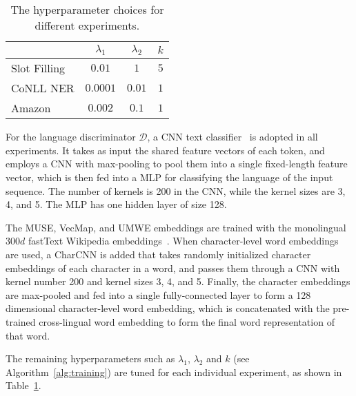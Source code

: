 \documentclass[11pt,a4paper]{article}
\def\gD{{\mathcal{D}}}
\begin{document}
\begin{table}
\centering
\begin{tabular}{l c c c}
        \toprule
        & $\lambda_1$ & $\lambda_2$ & $k$ \\
        \midrule
        Slot Filling    & $0.01$ & $1$ & $5$ \\
        CoNLL NER & $0.0001$ & $0.01$ & $1$ \\
        Amazon & $0.002$ & $0.1$ & $1$ \\
        \bottomrule
    \end{tabular}
    \caption{The hyperparameter choices for different experiments.}
    \label{tab:hyperparam}
\end{table} 
For the language discriminator $\gD$, a CNN text classifier~\cite{D14-1181} is adopted in all experiments.
It takes as input the shared feature vectors of each token, and employs a CNN with max-pooling to pool them into a single fixed-length feature vector, which is then fed into a MLP for classifying the language of the input sequence.
The number of kernels is 200 in the CNN, while the kernel sizes are 3, 4, and 5.
The MLP has one hidden layer of size 128.

The MUSE, VecMap, and UMWE embeddings are trained with the monolingual $300d$ fastText Wikipedia embeddings~\citep{bojanowski2016enriching}.
When character-level word embeddings are used, a CharCNN is added that takes randomly initialized character embeddings of each character in a word, and passes them through a CNN with kernel number 200 and kernel sizes 3, 4, and 5.
Finally, the character embeddings are max-pooled and fed into a single fully-connected layer to form a 128 dimensional character-level word embedding, which is concatenated with the pre-trained cross-lingual word embedding to form the final word representation of that word.

The remaining hyperparameters such as $\lambda_1$, $\lambda_2$ and $k$ (see Algorithm~\ref{alg:training}) are tuned for each individual experiment, as shown in Table~\ref{tab:hyperparam}. 
\end{document}
